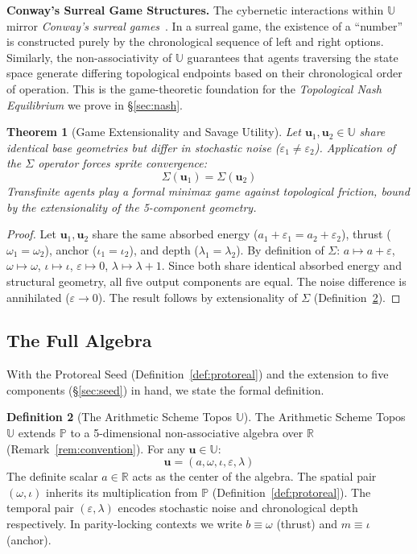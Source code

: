 \documentclass[12pt,oneside]{article}
\theoremstyle{principia}
\newtheorem{theorem}{Theorem}[section]
\theoremstyle{definition}
\newtheorem{definition}[theorem]{Definition}
\theoremstyle{remark}
\providecommand{\UU}{\mathbb{U}}
\providecommand{\PP}{\mathbb{P}}
\providecommand{\RR}{\mathbb{R}}
\providecommand{\eps}{\varepsilon}
\providecommand{\lam}{\lambda}
\begin{document}
\textbf{Conway's Surreal Game Structures.} The cybernetic interactions within $\UU$ mirror \emph{Conway's surreal games}~\cite{conway}. In a surreal game, the existence of a ``number'' is constructed purely by the chronological sequence of left and right options. Similarly, the non-associativity of $\UU$ guarantees that agents traversing the state space generate differing topological endpoints based on their chronological order of operation. This is the game-theoretic foundation for the \emph{Topological Nash Equilibrium} we prove in \S\ref{sec:nash}.

\begin{theorem}[Game Extensionality and Savage Utility]\label{thm:game-ext}
Let $\mathbf{u}_1, \mathbf{u}_2 \in \UU$ share identical base geometries but differ in stochastic noise ($\eps_1 \neq \eps_2$). Application of the $\Sigma$ operator forces sprite convergence:
$$\Sigma(\mathbf{u}_1) = \Sigma(\mathbf{u}_2)$$
Transfinite agents play a formal minimax game against topological friction, bound by the extensionality of the 5-component geometry.
\end{theorem}

\begin{proof}
Let $\mathbf{u}_1, \mathbf{u}_2$ share the same absorbed energy ($a_1 + \eps_1 = a_2 + \eps_2$), thrust ($\omega_1 = \omega_2$), anchor ($\iota_1 = \iota_2$), and depth ($\lam_1 = \lam_2$). By definition of $\Sigma$: $a \mapsto a + \eps$, $\omega \mapsto \omega$, $\iota \mapsto \iota$, $\eps \mapsto 0$, $\lam \mapsto \lam + 1$. Since both share identical absorbed energy and structural geometry, all five output components are equal. The noise difference is annihilated ($\eps \to 0$). The result follows by extensionality of $\Sigma$ (Definition~\ref{def:heisenberg}). \qedhere
\end{proof}

\subsection{The Full Algebra}

With the Protoreal Seed (Definition~\ref{def:protoreal}) and the extension to five components (\S\ref{sec:seed}) in hand, we state the formal definition.

\begin{definition}[The Arithmetic Scheme Topos $\UU$]\label{def:heisenberg}
The Arithmetic Scheme Topos $\UU$ extends $\PP$ to a 5-dimensional non-associative algebra over $\RR$ (Remark~\ref{rem:convention}). For any $\mathbf{u} \in \UU$:
$$\mathbf{u} = (a, \omega, \iota, \eps, \lam)$$
The definite scalar $a \in \RR$ acts as the center of the algebra. The spatial pair $(\omega, \iota)$ inherits its multiplication from $\PP$ (Definition~\ref{def:protoreal}). The temporal pair $(\eps, \lam)$ encodes stochastic noise and chronological depth respectively. In parity-locking contexts we write $b \equiv \omega$ (thrust) and $m \equiv \iota$ (anchor).
\end{definition}
\end{document}
